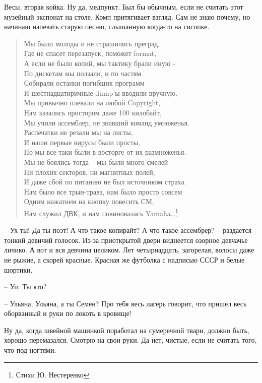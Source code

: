\documentclass[a4paper]{book}
\begin{document}
Весы, вторая койка. Ну да, медпункт. Был бы обычным, если не считать этот музейный экспонат на столе. Комп притягивает взгляд. Сам не знаю почему, но начинаю напевать старую песню, слышанную когда-то на сисопке.
\begin{verse}
Мы были молоды и не страшились преград,\\
Где не спасет перезапуск, поможет format,\\
А если не было копий, мы тактику брали иную -\\
По дискетам мы ползали, и по частям\\
Собирали останки погибших программ\\
И шестнадцатиричные dump'ы вводили вручную.\\
\bigskip
Мы привычно плевали на любой Copyright,\\
Нам казались простором даже 100 килобайт,\\
Мы учили ассемблер, не знавший команд умноженья.\\
Распечатки не резали мы на листы,\\
И наши первые вирусы были просты,\\
Но мы все-таки были в восторге от их размноженья.\\
\bigskip
Мы не боялись тогда -- мы были много смелей -\\
Ни плохих секторов, ни магнитных полей,\\
И даже сбой по питанию не был источником страха.\\
Нам было все трын-трава, нам было просто совсем\\
Одним нажатием на кнопку повесить СМ,\\
Нам служил ДВК, и нам повиновалась Yamaha\ldots\footnote{Стихи Ю. Нестеренко}
\end{verse}

-- Ух ты! Да ты поэт! А что такое копирайт? А что такое ассембрер? -- раздается тонкий девичий голосок. Из-за приоткрытой двери виднеется озорное девчачье личико. А вот и вся девчина целиком. Лет четырнадцать, загорелая, волосы даже не рыжие, а скорей красные. Красная же футболка с надписью СССР и белые шортики.

-- Уп. Ты кто? 

-- Ульяна, Ульяна, а ты Семен? Про тебя весь лагерь говорит, что пришел весь оборванный и руки по локоть в кровище!  

Ну да, когда швейной машинкой поработал на сумеречной твари, должно быть, хорошо перемазался. Смотрю на свои руки. Да нет, чистые, если не считать того, что под ногтями. 
\end{document}
